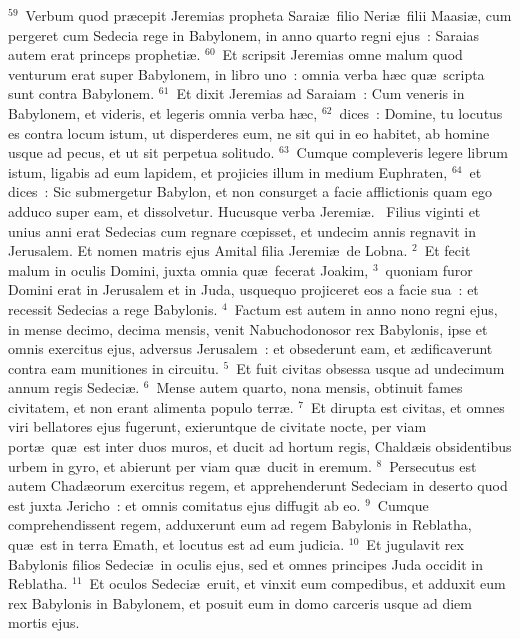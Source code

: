${}^{59}$~Verbum quod pr\ae cepit Jeremias propheta Sarai\ae\ filio Neri\ae\ filii Maasi\ae , cum pergeret cum Sedecia rege in Babylonem, in anno quarto regni ejus~: Saraias autem erat princeps propheti\ae .
${}^{60}$~Et scripsit Jeremias omne malum quod venturum erat super Babylonem, in libro uno~: omnia verba h\ae c qu\ae\ scripta sunt contra Babylonem.
${}^{61}$~Et dixit Jeremias ad Saraiam~: Cum veneris in Babylonem, et videris, et legeris omnia verba h\ae c,
${}^{62}$~dices~: Domine, tu locutus es contra locum istum, ut disperderes eum, ne sit qui in eo habitet, ab homine usque ad pecus, et ut sit perpetua solitudo.
${}^{63}$~Cumque compleveris legere librum istum, ligabis ad eum lapidem, et projicies illum in medium Euphraten,
${}^{64}$~et dices~: Sic submergetur Babylon, et non consurget a facie afflictionis quam ego adduco super eam, et dissolvetur. Hucusque verba Jeremi\ae .
~\lettrine[lines=10,image=true,loversize=0.05,lraise=-0.03]{F}{}ilius viginti et unius anni erat Sedecias cum regnare cœpisset, et undecim annis regnavit in Jerusalem. Et nomen matris ejus Amital filia Jeremi\ae\ de Lobna.
${}^{2}$~Et fecit malum in oculis Domini, juxta omnia qu\ae\ fecerat Joakim,
${}^{3}$~quoniam furor Domini erat in Jerusalem et in Juda, usquequo projiceret eos a facie sua~: et recessit Sedecias a rege Babylonis.
${}^{4}$~Factum est autem in anno nono regni ejus, in mense decimo, decima mensis, venit Nabuchodonosor rex Babylonis, ipse et omnis exercitus ejus, adversus Jerusalem~: et obsederunt eam, et \ae dificaverunt contra eam munitiones in circuitu.
${}^{5}$~Et fuit civitas obsessa usque ad undecimum annum regis Sedeci\ae .
${}^{6}$~Mense autem quarto, nona mensis, obtinuit fames civitatem, et non erant alimenta populo terr\ae .
${}^{7}$~Et dirupta est civitas, et omnes viri bellatores ejus fugerunt, exieruntque de civitate nocte, per viam port\ae\ qu\ae\ est inter duos muros, et ducit ad hortum regis, Chald\ae is obsidentibus urbem in gyro, et abierunt per viam qu\ae\ ducit in eremum.
${}^{8}$~Persecutus est autem Chad\ae orum exercitus regem, et apprehenderunt Sedeciam in deserto quod est juxta Jericho~: et omnis comitatus ejus diffugit ab eo.
${}^{9}$~Cumque comprehendissent regem, adduxerunt eum ad regem Babylonis in Reblatha, qu\ae\ est in terra Emath, et locutus est ad eum judicia.
${}^{10}$~Et jugulavit rex Babylonis filios Sedeci\ae\ in oculis ejus, sed et omnes principes Juda occidit in Reblatha.
${}^{11}$~Et oculos Sedeci\ae\ eruit, et vinxit eum compedibus, et adduxit eum rex Babylonis in Babylonem, et posuit eum in domo carceris usque ad diem mortis ejus.
